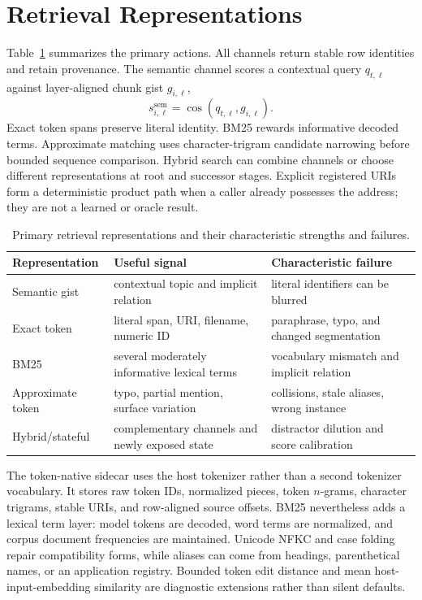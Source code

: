 \documentclass[11pt]{article}
\begin{document}
\section{Retrieval Representations}
Table~\ref{tab:representations} summarizes the primary actions. All channels return stable row identities and retain provenance. The semantic channel scores a contextual query $q_{t,\ell}$ against layer-aligned chunk gist $g_{i,\ell}$,
\[
s^{\mathrm{sem}}_{i,\ell}=\cos(q_{t,\ell},g_{i,\ell}).
\]
Exact token spans preserve literal identity. BM25 rewards informative decoded terms. Approximate matching uses character-trigram candidate narrowing before bounded sequence comparison. Hybrid search can combine channels or choose different representations at root and successor stages. Explicit registered URIs form a deterministic product path when a caller already possesses the address; they are not a learned or oracle result.

\begin{table}[H]
\centering
\small
\caption{Primary retrieval representations and their characteristic strengths and failures.}
\label{tab:representations}
\begin{tabularx}{\linewidth}{lXX}
\toprule
Representation & Useful signal & Characteristic failure\\
\midrule
Semantic gist & contextual topic and implicit relation & literal identifiers can be blurred\\
Exact token & literal span, URI, filename, numeric ID & paraphrase, typo, and changed segmentation\\
BM25 & several moderately informative lexical terms & vocabulary mismatch and implicit relation\\
Approximate token & typo, partial mention, surface variation & collisions, stale aliases, wrong instance\\
Hybrid/stateful & complementary channels and newly exposed state & distractor dilution and score calibration\\
\bottomrule
\end{tabularx}
\end{table}

The token-native sidecar uses the host tokenizer rather than a second tokenizer vocabulary. It stores raw token IDs, normalized pieces, token $n$-grams, character trigrams, stable URIs, and row-aligned source offsets. BM25 nevertheless adds a lexical term layer: model tokens are decoded, word terms are normalized, and corpus document frequencies are maintained. Unicode NFKC and case folding repair compatibility forms, while aliases can come from headings, parenthetical names, or an application registry. Bounded token edit distance and mean host-input-embedding similarity are diagnostic extensions rather than silent defaults.
\end{document}
